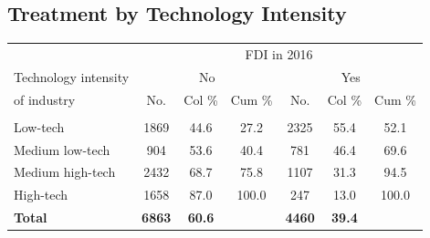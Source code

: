 \documentclass[a4paper,11pt]{scrartcl}
\begin{document}
\subsection{Treatment by Technology Intensity}
\label{app:tech}
\begin{table}[htbp]
	\centering
\begin{threeparttable}

\begin{tabular}{lcccccc} 
\hline
\hline
 & \multicolumn{6}{c}{FDI in 2016} \\
Technology intensity & \multicolumn{3}{c}{No} & \multicolumn{3}{c}{Yes} \\
of industry &No.&Col \% &Cum \% &No.&Col \% &Cum \% \\
\hline
	&  &  &  &  &  &   \\
Low-tech &1869&44.6&27.2&2325&55.4&52.1 \\
Medium low-tech &904&53.6&40.4&781&46.4&69.6 \\
Medium high-tech &2432&68.7&75.8&1107&31.3&94.5 \\
High-tech &1658&87.0&100.0&247&13.0&100.0 \\
\textbf{Total}&\textbf{6863}&\textbf{60.6}&&\textbf{4460}&\textbf{39.4}& \\
\hline
\hline
\end{tabular}

\end{threeparttable}
\end{table}
\end{document}
